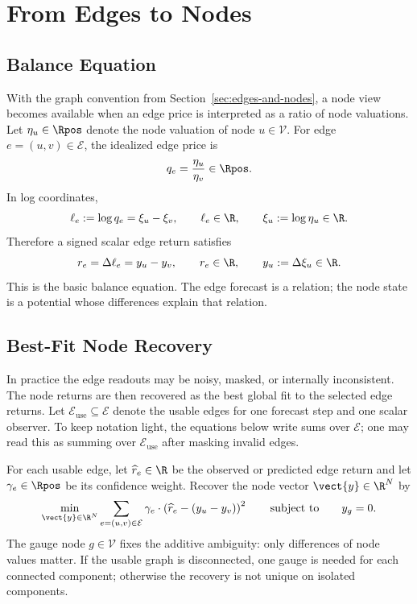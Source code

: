 \newpage{}
\section{From Edges to Nodes}
\label{sec:edges-to-nodes}

\subsection{Balance Equation}
\label{subsec:balance-equation}

With the graph convention from Section~\ref{sec:edges-and-nodes}, a node view
becomes available when an edge price is interpreted as a ratio of node
valuations.  Let $\eta_u\in\Rpos$ denote the node valuation of node
$u\in\mathcal{V}$.  For edge $e=(u,v)\in\mathcal{E}$, the idealized edge price
is
\[
  q_e
  =
  \frac{\eta_u}{\eta_v}
  \in\Rpos.
\]
In log coordinates,
\[
  \ell_e := \log q_e = \xi_u-\xi_v,
  \qquad
  \ell_e\in\R,
  \qquad
  \xi_u := \log\eta_u\in\R.
\]
Therefore a signed scalar edge return satisfies
\[
  r_e
  =
  \Delta\ell_e
  =
  y_u-y_v,
  \qquad
  r_e\in\R,
  \qquad
  y_u := \Delta\xi_u\in\R.
\]
This is the basic balance equation.  The edge forecast is a relation; the node
state is a potential whose differences explain that relation.

\subsection{Best-Fit Node Recovery}
\label{subsec:best-fit-node-recovery}

In practice the edge readouts may be noisy, masked, or internally inconsistent.
The node returns are then recovered as the best global fit to the selected edge
returns.  Let $\mathcal{E}_{\mathrm{use}}\subseteq\mathcal{E}$ denote the
usable edges for one forecast step and one scalar observer.  To keep notation
light, the equations below write sums over $\mathcal{E}$; one may read this as
summing over $\mathcal{E}_{\mathrm{use}}$ after masking invalid edges.

For each usable edge, let $\widehat{r}_e\in\R$ be the observed or predicted edge
return and let $\gamma_e\in\Rpos$ be its confidence weight.  Recover the node
vector $\vect{y}\in\R^N$ by
\[
  \min_{\vect{y}\in\R^N}
  \sum_{e=(u,v)\in\mathcal{E}}
  \gamma_e\cdot
  \left(
    \widehat{r}_e-(y_u-y_v)
  \right)^2
  \qquad\text{subject to}\qquad
  y_g=0.
\]
The gauge node $g\in\mathcal{V}$ fixes the additive ambiguity: only differences
of node values matter.  If the usable graph is disconnected, one gauge is
needed for each connected component; otherwise the recovery is not unique on
isolated components.

